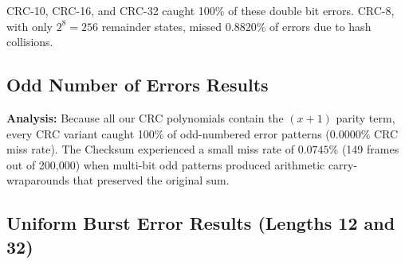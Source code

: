 \documentclass[12pt,a4paper]{article}
\begin{document}
CRC-10, CRC-16, and CRC-32 caught 100\% of these double bit errors. CRC-8, with only $2^8 = 256$ remainder states, missed 0.8820\% of errors due to hash collisions.

\subsection{Odd Number of Errors Results}
\begin{table}[htbp]
\centering
\small
{}
\caption{Odd Number of Errors Detection Rates (200,000 trials).}
\label{tab:odderrs}
\end{table}
\noindent\textbf{Analysis:} Because all our CRC polynomials contain the $(x+1)$ parity term, every CRC variant caught 100\% of odd-numbered error patterns ($0.0000\%$ CRC miss rate). The Checksum experienced a small miss rate of $0.0745\%$ (149 frames out of 200,000) when multi-bit odd patterns produced arithmetic carry-wraparounds that preserved the original sum.

\subsection{Uniform Burst Error Results (Lengths 12 and 32)}
\end{document}
